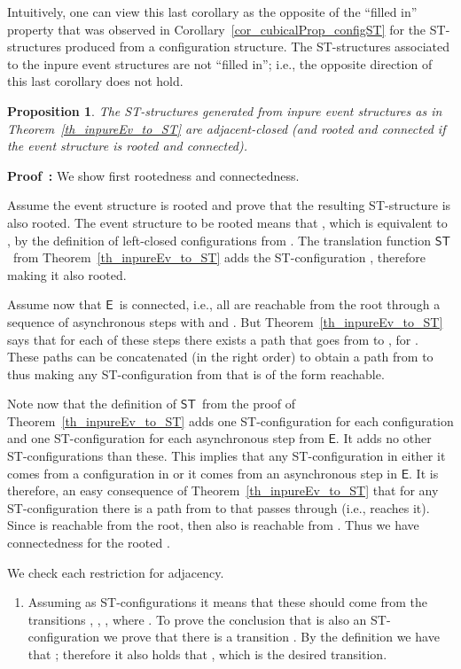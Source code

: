 \documentclass[submission,copyright,creativecommons]{eptcs}
\newtheorem{proposition}[theorem]{Proposition}
\newenvironment{proof}[1][\!\!\,]{\vspace{1ex}\noindent\textbf{Proof #1: }}{\hfill\vspace{2ex}}
\newcommand\E{\ensuremath{\mathsf{E}}}
\newcommand\cintost{\ensuremath{\mathsf{ST}}}
\newcommand\eintost{\ensuremath{\cintost}}
\begin{document}
Intuitively, one can view this last corollary as the opposite of the ``filled in'' property that was observed in Corollary~\ref{cor_cubicalProp_configST} for the ST-structures produced from a configuration structure. The ST-structures associated to the inpure event structures are not ``filled in''; i.e., the opposite direction of this last corollary does not hold.

\begin{proposition}\label{prop_evnST_adjacentclosed}
The ST-structures generated from inpure event structures as in Theorem~\ref{th_inpureEv_to_ST} are adjacent-closed (and rooted and connected if the event structure is rooted and connected).
\end{proposition}


\begin{proof}
We show first rootedness and connectedness.

Assume the event structure  is rooted and prove that the resulting ST-structure  is also rooted.
The event structure to be rooted means that , which is equivalent to , by the definition of left-closed configurations  from \cite[Def.1.4]{GlabbeekP09configStruct}.
The translation function \eintost\ from Theorem~\ref{th_inpureEv_to_ST} adds the ST-configuration , therefore making it also rooted.

Assume now that \E\ is connected, i.e., all  are reachable from the root  through a sequence of asynchronous steps  with  and . But Theorem~\ref{th_inpureEv_to_ST} says that for each of these steps there exists a path  that goes from  to , for . These paths can be concatenated (in the right order) to obtain a path from  to  thus making any ST-configuration from  that is of the form  reachable.

Note now that the definition of \eintost\ from the proof of Theorem~\ref{th_inpureEv_to_ST} adds one ST-configuration  for each configuration  and one ST-configuration  for each asynchronous step from \E. It adds no other ST-configurations than these. This implies that any ST-configuration in  either it comes from a configuration in  or it comes from an asynchronous step in \E.
It is therefore, an easy consequence of Theorem~\ref{th_inpureEv_to_ST} that for any ST-configuration  there is a path from  to  that passes through  (i.e., reaches it). Since  is reachable from the root, then also  is reachable from . Thus we have connectedness for the rooted .



We check each restriction for adjacency. 
\begin{enumerate}
\item Assuming  as ST-configurations it means that these should come from the transitions , , , where . To prove the conclusion that  is also an ST-configuration we prove that there is a transition . By the definition we have that ; therefore it also holds that , which is the desired transition.


\end{enumerate}
\end{proof}
\end{document}

